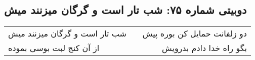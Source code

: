 \begin{center}
\section*{دوبیتی شماره ۷۵: شب تار است و گرگان میزنند میش}
\label{sec:075}
\begin{longtable}{l p{0.5cm} r}
شب تار است و گرگان میزنند میش
&&
دو زلفانت حمایل کن بوره پیش
\\
از آن کنج لبت بوسی بموده
&&
بگو راه خدا دادم بدرویش
\\
\end{longtable}
\end{center}
